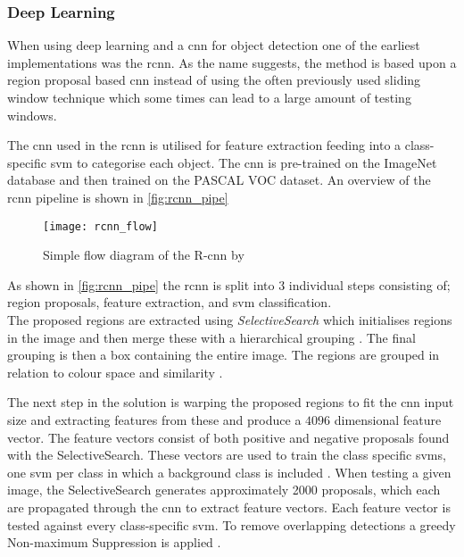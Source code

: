 \subsubsection{Deep Learning}
When using deep learning and a \gls{cnn} for object detection one of the earliest implementations was the \gls{rcnn}. As the name suggests, the method is based upon a region proposal based \gls{cnn} instead of using the often previously used sliding window technique which some times can lead to a large amount of testing windows.

The \gls{cnn} used in the \gls{rcnn} is utilised for feature extraction feeding into a class-specific \gls{svm} to categorise each object. The \gls{cnn} is pre-trained on the ImageNet database and then trained on the PASCAL VOC dataset. An overview of the \gls{rcnn} pipeline is shown in \autoref{fig:rcnn_pipe}

\begin{figure}[h]
	\centering
	\texttt{[image: rcnn\_flow]}
	\caption{Simple flow diagram of the R-\gls{cnn} by \cite{Girshick2014}}
	\label{fig:rcnn_pipe}
\end{figure}

As shown in \autoref{fig:rcnn_pipe} the \gls{rcnn} is split into 3 individual steps consisting of; region proposals, feature extraction, and \gls{svm} classification.\\

The proposed regions are extracted using \textit{SelectiveSearch} which initialises regions in the image and then merge these with a hierarchical grouping \citep{Uijlings2013}. The final grouping is then a box containing the entire image. The regions are grouped in relation to colour space and similarity \citep{Girshick2014}. 

The next step in the solution is warping the proposed regions to fit the \gls{cnn} input size and extracting features from these and produce a $4096$ dimensional feature vector. The feature vectors consist of both positive and negative proposals found with the SelectiveSearch. These vectors are used to train the class specific \gls{svm}s, one \gls{svm} per class in which a background class is included \citep{Girshick2014}.
When testing a given image, the SelectiveSearch generates approximately 2000 proposals, which each are propagated through the \gls{cnn} to extract feature vectors. Each feature vector is tested against every class-specific \gls{svm}. To remove overlapping detections a greedy Non-maximum Suppression is applied \citep{Girshick2014}.

